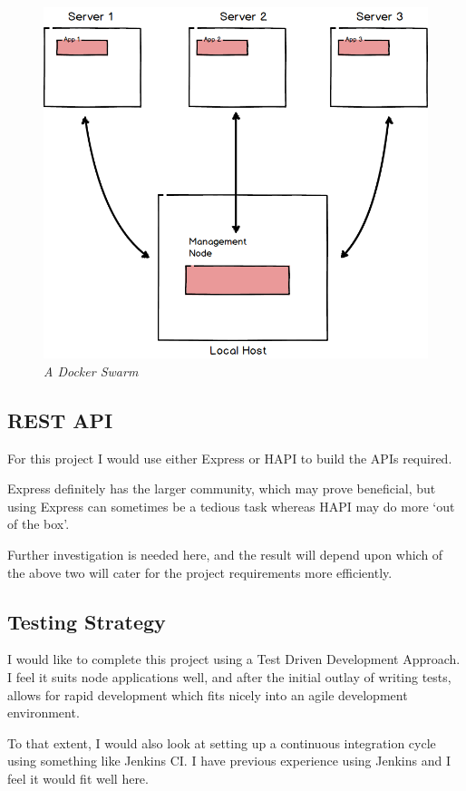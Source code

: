 \documentclass{article}
\begin{document}
\begin{figure}[!hb]
\centering
\includegraphics*[width=\textwidth]{components/swarm}
\caption{\em A Docker Swarm}
\label{fig:swarm}
\end{figure}

\newpage
\subsection{REST API}
For this project I would use either Express or HAPI to build the APIs required. 

Express definitely has the larger community, which may prove beneficial, but using Express can sometimes be a tedious task whereas HAPI may do more `out of the box'.

Further investigation is needed here, and the result will depend upon which of the above two will cater for the project requirements more efficiently.

\subsection{Testing Strategy}
I would like to complete this project using a Test Driven Development Approach. I feel it suits node applications well, and after the initial outlay of writing tests, allows for rapid development which fits nicely into an agile development environment.

To that extent, I would also look at setting up a continuous integration cycle using something like Jenkins CI. I have previous experience using Jenkins and I feel it would fit well here. 
\end{document}

